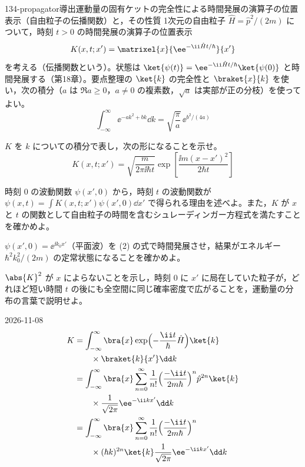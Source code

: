 \documentclass[uplatex,dvipdfmx,a4paper,11pt]{jsarticle}
\begin{document}
\begin{mondai}{134-propagator}{導出}{運動量の固有ケットの完全性による時間発展の演算子の位置表示（自由粒子の伝播関数）と，その性質}
1次元の自由粒子 $\hat{H}=\hat{p}^{2}/(2m)$ について，時刻 $t>0$ の時間発展の演算子の位置表示
  \[ K(x,t;x')=\matrixel{x}{\ee^{-\ii\hat{H}t/\hbar}}{x'} \]
  を考える（伝播関数という）。状態は $\ket{\psi(t)}=\ee^{-\ii\hat{H}t/\hbar}\ket{\psi(0)}$ と時間発展する（第18章）。要点整理の $\ket{k}$ の完全性と $\braket{x}{k}$ を使い，次の積分（$a$ は $\Re a\ge0$，$a\neq0$ の複素数，$\sqrt{a}$ は実部が正の分枝）を使ってよい。
  \[ \int_{-\infty}^{\infty}\ee^{-ak^{2}+bk}\dd k=\sqrt{\frac{\pi}{a}}\,\ee^{b^{2}/(4a)} \]
  \begin{shoumon}
    \item $K$ を $k$ についての積分で表し，次の形になることを示せ。
    \[ K(x,t;x')=\sqrt{\frac{m}{2\pi\ii\hbar t}}\exp\left[\frac{\ii m(x-x')^{2}}{2\hbar t}\right] \]
    \item 時刻 $0$ の波動関数 $\psi(x',0)$ から，時刻 $t$ の波動関数が $\psi(x,t)=\int K(x,t;x')\psi(x',0)\dd x'$ で得られる理由を述べよ。また，$K$ が $x$ と $t$ の関数として自由粒子の時間を含むシュレーディンガー方程式を満たすことを確かめよ。
    \item $\psi(x',0)=\ee^{\ii k_{0}x'}$（平面波）を (2) の式で時間発展させ，結果がエネルギー $\hbar^{2}k_{0}^{2}/(2m)$ の定常状態になることを確かめよ。
    \item $\abs{K}^{2}$ が $x$ によらないことを示し，時刻 $0$ に $x'$ に局在していた粒子が，どれほど短い時間 $t$ の後にも全空間に同じ確率密度で広がることを，運動量の分布の言葉で説明せよ。
  \end{shoumon}
\begin{kotaeutsushi}{2026-11-08}
\begin{align*}
K&=\int_{-\infty}^{\infty}\bra{x}\exp\Bigl(-\frac{\ii t}{\hbar}\hat{H}\Bigr)\ket{k}\\
&\qquad\times\braket{k}{x'}\dd k\\
&=\int_{-\infty}^{\infty}\bra{x}\sum_{n=0}^{\infty}\frac{1}{n!}\Bigl(\frac{-\ii t}{2m\hbar}\Bigr)^{n}\hat{p}^{2n}\ket{k}\\
&\qquad\times\frac{1}{\sqrt{2\pi}}\ee^{-\ii kx'}\dd k\\
&=\int_{-\infty}^{\infty}\bra{x}\sum_{n=0}^{\infty}\frac{1}{n!}\Bigl(\frac{-\ii t}{2m\hbar}\Bigr)^{n}\\
&\qquad\times(\hbar k)^{2n}\ket{k}\frac{1}{\sqrt{2\pi}}\ee^{-\ii kx'}\dd k\\

\end{align*}
\end{kotaeutsushi}
\end{mondai}
\end{document}
